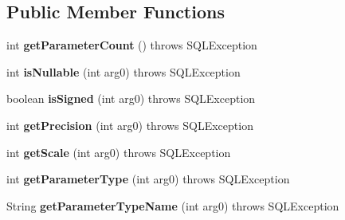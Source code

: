 \subsection*{Public Member Functions}
\begin{DoxyCompactItemize}
\item 
\mbox{\label{classcom_1_1mysql_1_1jdbc_1_1_mysql_parameter_metadata_a037142eab0fe6a17013424cccbb9d001}} 
int {\bfseries get\+Parameter\+Count} ()  throws S\+Q\+L\+Exception 
\item 
\mbox{\label{classcom_1_1mysql_1_1jdbc_1_1_mysql_parameter_metadata_a0956616a1726666b73cf2f6f4485c317}} 
int {\bfseries is\+Nullable} (int arg0)  throws S\+Q\+L\+Exception 
\item 
\mbox{\label{classcom_1_1mysql_1_1jdbc_1_1_mysql_parameter_metadata_a288a6892860c8f566ffdf7ffb1ae748a}} 
boolean {\bfseries is\+Signed} (int arg0)  throws S\+Q\+L\+Exception 
\item 
\mbox{\label{classcom_1_1mysql_1_1jdbc_1_1_mysql_parameter_metadata_ab662a834ba3da24de514280a36bcff97}} 
int {\bfseries get\+Precision} (int arg0)  throws S\+Q\+L\+Exception 
\item 
\mbox{\label{classcom_1_1mysql_1_1jdbc_1_1_mysql_parameter_metadata_aa14863cc2b9aa724a520017de525ddbc}} 
int {\bfseries get\+Scale} (int arg0)  throws S\+Q\+L\+Exception 
\item 
\mbox{\label{classcom_1_1mysql_1_1jdbc_1_1_mysql_parameter_metadata_a98034508cd75a8ee65163b47e4a74fd9}} 
int {\bfseries get\+Parameter\+Type} (int arg0)  throws S\+Q\+L\+Exception 
\item 
\mbox{\label{classcom_1_1mysql_1_1jdbc_1_1_mysql_parameter_metadata_a8fe49ebadb647688b76ffe7f518edc4d}} 
String {\bfseries get\+Parameter\+Type\+Name} (int arg0)  throws S\+Q\+L\+Exception 
\item 
\mbox{\label{classcom_1_1mysql_1_1jdbc_1_1_mysql_parameter_metadata_a5e3d27b60a3c83e52c75ad4996b649c3}} 

\end{DoxyCompactItemize}
